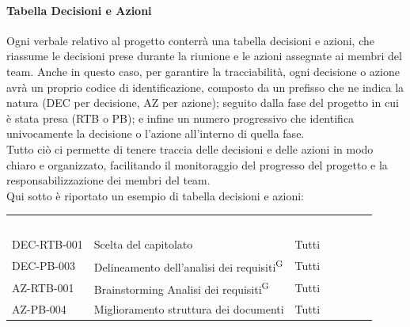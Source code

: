 \documentclass[a4paper, 11pt]{article}
\begin{document}
\paragraph{Tabella Decisioni e Azioni}
Ogni verbale relativo al progetto conterrà una tabella decisioni e azioni, che riassume le decisioni prese durante la riunione e le azioni assegnate ai membri del team.
Anche in questo caso, per garantire la tracciabilità, ogni decisione o azione avrà un proprio codice di identificazione,
composto da un prefisso che ne indica la natura (DEC per decisione, AZ per azione); seguito dalla fase del progetto in cui è stata presa (RTB o PB); e infine un numero progressivo che identifica univocamente la decisione o l'azione all'interno di quella fase.
\\
Tutto ciò ci permette di tenere traccia delle decisioni e delle azioni in modo chiaro e organizzato, facilitando il monitoraggio del progresso del progetto e la responsabilizzazione dei membri del team.
\\
Qui sotto è riportato un esempio di tabella decisioni e azioni:
\begin{center}
    \begin{tabular}{>{\centering\arraybackslash}m{2cm} >{\raggedright\arraybackslash}p{8cm} >{\centering\arraybackslash}p{2.5cm}}
        \rowcolor{AccentColor}
        \textcolor{white}{\textbf{Codice}} & 
        \multicolumn{1}{c}{\textcolor{white}{\textbf{Descrizione}}} & 
        \textcolor{white}{\textbf{Assegnatario}} \\
        
        DEC-RTB-001 & Scelta del capitolato & Tutti \\
        DEC-PB-003 & Delineamento dell'analisi dei requisiti\textsuperscript{G} & Tutti \\
        \midrule
        AZ-RTB-001 & Brainstorming Analisi dei requisiti\textsuperscript{G} & Tutti \\
        AZ-PB-004 & Miglioramento struttura dei documenti & Tutti \\
    \end{tabular}
\end{center}
\end{document}
